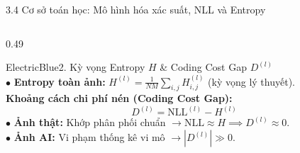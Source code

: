 \documentclass[aspectratio=169, 10pt, t]{beamer}
\begin{document}
\begin{frame}{3.4 Cơ sở toán học: Mô hình hóa xác suất, NLL và Entropy}
\begin{columns}[T, totalwidth=\linewidth]
\begin{column}{0.49\linewidth}
\begin{accentbox}[equal height group=s7math, top=0.8mm, bottom=0.8mm]{ElectricBlue}{2. Kỳ vọng Entropy $H$ \& Coding Cost Gap $D^{(l)}$}
{\begin{equation*}
        \end{equation*}}
        \vspace{-0.25em}
        $\bullet$ \textbf{Entropy toàn ảnh:} $H^{(l)} = \frac{1}{NM} \sum_{i,j} H^{(l)}_{i,j}$ (kỳ vọng lý thuyết).\\
        \vspace{0.12em}
        \textbf{Khoảng cách chi phí nén (Coding Cost Gap):}\\
        {\tiny
        \begin{equation*}
          D^{(l)} = \text{NLL}^{(l)} - H^{(l)}
        \end{equation*}}
        \vspace{-0.20em}
        $\bullet$ \textbf{Ảnh thật:} Khớp phân phối chuẩn $\longrightarrow \text{NLL} \approx H \implies D^{(l)} \approx 0$.\\
        \vspace{0.04em}
        $\bullet$ \textbf{Ảnh AI:} Vi phạm thống kê vi mô $\longrightarrow |D^{(l)}| \gg 0$.
      \end{accentbox}
    \end{column}
  \end{columns}
\end{frame}
\end{document}
